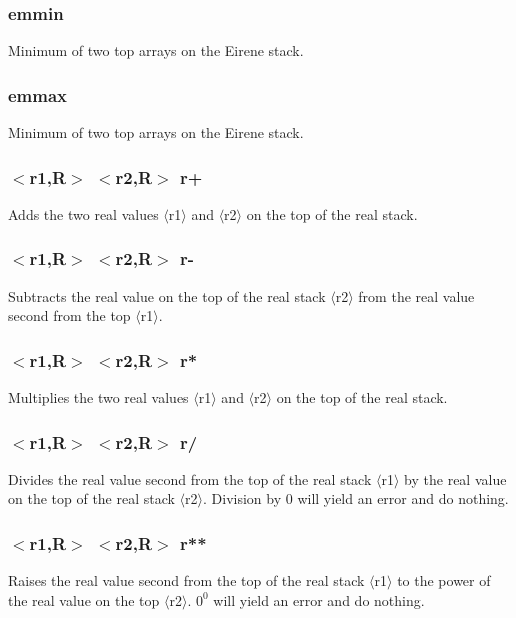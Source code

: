 \documentclass[a4paper,10pt]{report}
\begin{document}
\subsubsection{emmin}\label{sec:emmin}
Minimum of two top arrays on the Eirene stack.

\subsubsection{emmax}\label{sec:emmax}
Minimum of two top arrays on the Eirene stack.

\subsubsection{$<$r1,{\bf R}$>$ $<$r2,{\bf R}$>$ r+}\label{sec:r+}
Adds the two real values $\langle$r1$\rangle$ and $\langle$r2$\rangle$ on the top of the real stack.

\subsubsection{$<$r1,{\bf R}$>$ $<$r2,{\bf R}$>$ r-}\label{sec:r-}
Subtracts the real value on the top of the real stack $\langle$r2$\rangle$ from the real value
second from the top $\langle$r1$\rangle$.

\subsubsection{$<$r1,{\bf R}$>$ $<$r2,{\bf R}$>$ r*}\label{sec:r*}
Multiplies the two real values $\langle$r1$\rangle$ and $\langle$r2$\rangle$ on the top of the real stack.

\subsubsection{$<$r1,{\bf R}$>$ $<$r2,{\bf R}$>$ r/}\label{sec:r/}
Divides the real value second from the top of the real stack $\langle$r1$\rangle$ by the real value on the top of the real stack $\langle$r2$\rangle$. Division by 0 will yield an error and do nothing.

\subsubsection{$<$r1,{\bf R}$>$ $<$r2,{\bf R}$>$ r**}\label{sec:r**}
Raises the real value second from the top of the real stack $\langle$r1$\rangle$ to the power of
the real value on the top $\langle$r2$\rangle$. $0^0$ will yield an error and do nothing.
\end{document}
